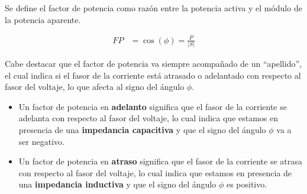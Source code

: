 \documentclass[
  11pt,
  letterpaper,
   addpoints,
  ]{exam}
\begin{document}
Se define el factor de potencia como razón entre la potencia activa y el módulo de la potencia aparente.

\begin{align}
FP &= \cos(\phi) = \frac{P}{|S|}
\end{align}

Cabe destacar que el factor de potencia va siempre acompañado de un “apellido”, el cual indica si el fasor de la corriente está atrasado o adelantado con respecto al fasor del voltaje, lo que afecta al signo del ángulo $\phi$.

\begin{itemize}
    \item Un factor de potencia en \textbf{adelanto} significa que el fasor de la corriente se adelanta con respecto al fasor del voltaje, lo cual indica que estamos en presencia de una \textbf{impedancia capacitiva} y que el signo del ángulo $\phi$ va a ser negativo.
    \item Un factor de potencia en \textbf{atraso} significa que el fasor de la corriente se atrasa con respecto al fasor del voltaje, lo cual indica que estamos en presencia de una \textbf{impedancia inductiva} y que el signo del ángulo $\phi$ es positivo.
\end{itemize}
\end{document}
